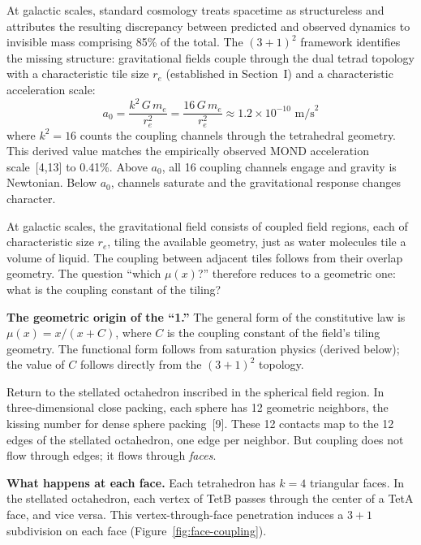 \documentclass[11pt]{article}
\begin{document}
At galactic scales, standard cosmology treats spacetime as structureless and attributes the resulting discrepancy between predicted and observed dynamics to invisible mass comprising 85\% of the total.
The $(3+1)^2$ framework identifies the missing structure: gravitational fields couple through the dual tetrad topology with a characteristic tile size $r_e$ (established in Section~I) and a characteristic acceleration scale:
\begin{equation}
a_0 = \frac{k^2\,G\,m_e}{r_e^2} = \frac{16\,G\,m_e}{r_e^2} \approx 1.2 \times 10^{-10}\text{ m/s}^2
\label{eq:a0}
\end{equation}
where $k^2 = 16$ counts the coupling channels through the tetrahedral geometry.
This derived value matches the empirically observed MOND acceleration scale~[4,13] to 0.41\%.
Above $a_0$, all 16 coupling channels engage and gravity is Newtonian.
Below $a_0$, channels saturate and the gravitational response changes character.

At galactic scales, the gravitational field consists of coupled field regions, each of characteristic size $r_e$, tiling the available geometry, just as water molecules tile a volume of liquid.
The coupling between adjacent tiles follows from their overlap geometry.
The question ``which $\mu(x)$?'' therefore reduces to a geometric one: what is the coupling constant of the tiling?


\textbf{The geometric origin of the ``1.''}\quad
The general form of the constitutive law is $\mu(x) = x/(x + C)$, where $C$ is the coupling constant of the field's tiling geometry.
The functional form follows from saturation physics (derived below); the value of $C$ follows directly from the $(3+1)^2$ topology.

Return to the stellated octahedron inscribed in the spherical field region.
In three-dimensional close packing, each sphere has 12 geometric neighbors, the kissing number for dense sphere packing~[9].
These 12 contacts map to the 12 edges of the stellated octahedron, one edge per neighbor.
But coupling does not flow through edges; it flows through \emph{faces}.

\textbf{What happens at each face.}\quad
Each tetrahedron has $k = 4$ triangular faces.
In the stellated octahedron, each vertex of TetB passes through the center of a TetA face, and vice versa.
This vertex-through-face penetration induces a $3 + 1$ subdivision on each face (Figure~\ref{fig:face-coupling}).
\end{document}
